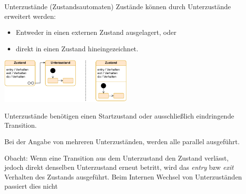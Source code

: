 \begin{defi}{Unterzustände (Zustandsautomaten)}
    Zustände können durch Unterzustände erweitert werden:
    \begin{itemize}
        \item Entweder in einen externen Zustand ausgelagert, oder
        \item direkt in einen Zustand hineingezeichnet.
    \end{itemize}

    \begin{center}
        \includegraphics[width=0.5\textwidth]{includes/figures/defi_diagrams_state_substate.pdf}
    \end{center}

    Unterzustände benötigen einen Startzustand oder ausschließlich eindringende Transition.

    Bei der Angabe von mehreren Unterzuständen, werden alle parallel ausgeführt.

    Obacht: Wenn eine Transition aus dem Unterzustand den Zustand verlässt, jedoch direkt denselben Unterzustand erneut betritt, wird das \emph{entry} bzw \emph{exit} Verhalten des Zustands ausgeführt.
    Beim Internen Wechsel von Unterzuständen passiert dies nicht
\end{defi}

